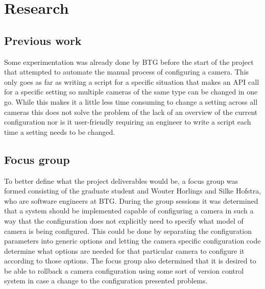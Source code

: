 \chapter{Research}

\section{Previous work}
Some experimentation was already done by BTG before the start of the project that attempted to automate the manual process of configuring a camera.
This only goes as far as writing a script for a specific situation that makes an API call for a specific setting so multiple cameras of the same type can be changed in one go.
While this makes it a little less time consuming to change a setting across all cameras this does not solve the problem of the lack of an overview of the current configuration nor is it user-friendly requiring an engineer to write a script each time a setting needs to be changed.

\section{Focus group}
To better define what the project deliverables would be, a focus group was formed consisting of the graduate student and  Wouter Horlings and Silke Hofstra, who are software engineers at BTG.
During the group sessions it was determined that a system should be implemented capable of configuring a camera in such a way that the configuration does not explicitly need to specify what model of camera is being configured.
This could be done by separating the configuration parameters into generic options and letting the camera specific configuration code determine what options are needed for that particular camera to configure it according to those options.
The focus group also determined that it is desired to be able to rollback a camera configuration using some sort of version control system in case a change to the configuration presented problems.



